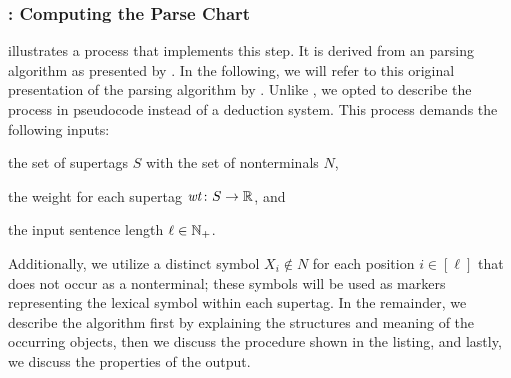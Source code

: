 \documentclass[../../document.tex]{subfiles}
\begin{document}
    \subsubsection*{: Computing the Parse Chart}
     illustrates a process that implements this step.
    It is derived from an  parsing algorithm as presented by \citet[the na\"ive algorithm in Section~3]{Burden05}.
    In the following, we will refer to this original presentation of the parsing algorithm by .
    Unlike , we opted to describe the process in pseudocode instead of a deduction system.
    This process demands the following inputs:
    \begin{inparaitem}[]
        \item the set of  supertags \(S\) with the set of nonterminals \(N\),
        \item the weight for each supertag \(\mathit{wt}\colon S \to \mathbb{R}\), and
        \item the input sentence length \(\ell \in \mathbb{N}_+\).
    \end{inparaitem}
    Additionally, we utilize a distinct symbol \(X_i \notin N\) for each position \(i \in [\ell]\) that does not occur as a nonterminal; these symbols will be used as markers representing the lexical symbol within each supertag.
    In the remainder, we describe the algorithm first by explaining the structures and meaning of the occurring objects, then we discuss the procedure shown in the listing, and lastly, we discuss the properties of the output.
\end{document}
